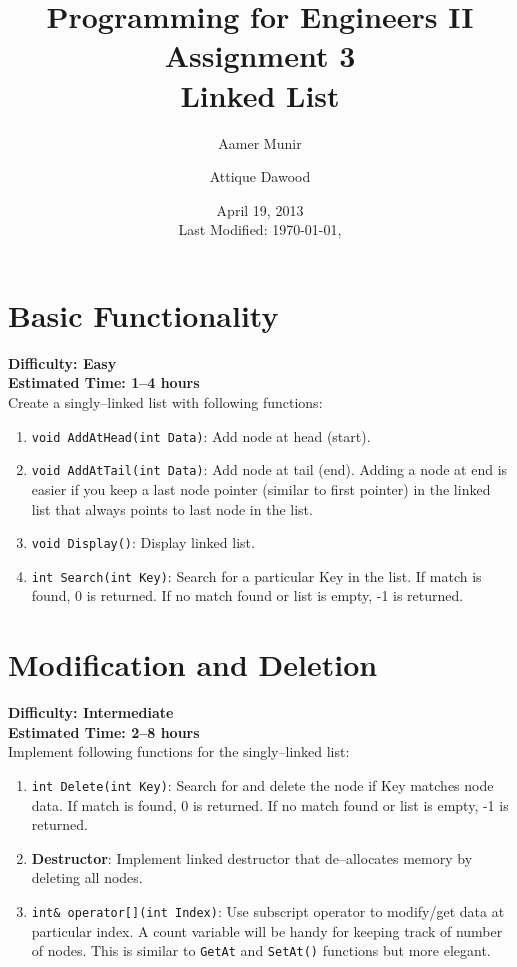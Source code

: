 \documentclass[12pt,a4paper]{article}
\title{\vspace{-2cm}Programming for Engineers II\\Assignment 3\\Linked List}
\author{Aamer Munir\and Attique Dawood}
\date{April 19, 2013\\[0.2cm] Last Modified: \today, \currenttime}
\begin{document}
\maketitle
\section{Basic Functionality}
\noindent\textbf{Difficulty: Easy}\\
\noindent\textbf{Estimated Time: 1--4 hours}\\[0.2cm]
Create a singly--linked list with following functions:
\begin{enumerate}
\item \verb|void AddAtHead(int Data)|: Add node at head (start).
\item \verb|void AddAtTail(int Data)|: Add node at tail (end). Adding a node at end is easier if you keep a last node pointer (similar to first pointer) in the linked list that always points to last node in the list.
\item \verb|void Display()|: Display linked list.
\item \verb|int Search(int Key)|: Search for a particular Key in the list. If match is found, 0 is returned. If no match found or list is empty, -1 is returned.
\end{enumerate}
\section{Modification and Deletion}
\noindent\textbf{Difficulty: Intermediate}\\
\noindent\textbf{Estimated Time: 2--8 hours}\\[0.2cm]
Implement following functions for the singly--linked list:
\begin{enumerate}
\item \verb|int Delete(int Key)|: Search for and delete the node if Key matches node data. If match is found, 0 is returned. If no match found or list is empty, -1 is returned.
\item \textbf{Destructor}: Implement linked destructor that de--allocates memory by deleting all nodes.
\item \verb|int& operator[](int Index)|: Use subscript operator to modify/get data at particular index. A count variable will be handy for keeping track of number of nodes. This is similar to \verb|GetAt| and \verb|SetAt()| functions but more elegant.
\end{enumerate}
\newpage
\end{document}
